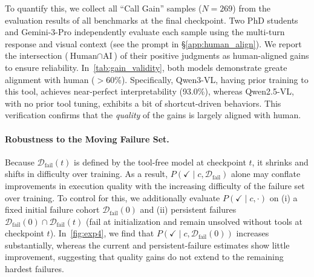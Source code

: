 To quantify this, we collect all ``Call Gain'' samples ($N=269$) from the evaluation results of all benchmarks at the final checkpoint.
%
Two PhD students and Gemini-3-Pro independently evaluate each sample using the multi-turn response and visual context (see the prompt in \S\ref{app:human_align}).
%
We report the intersection ($\text{Human} \cap \text{AI}$) of their positive judgments as human-aligned gains to ensure reliability.
%
In~\cref{tab:gain_validity}, both models demonstrate greate alignment with human ($>60\%$).
%
Specifically, Qwen3-VL, having prior training to this tool, achieves near-perfect interpretability (93.0\%), whereas Qwen2.5-VL, with no prior tool tuning, exhibits a bit of shortcut-driven behaviors.
%
This verification confirms that the \textit{quality} of the gains is largely aligned with human.

\paragraph{Robustness to the Moving Failure Set.}
\label{sec:moving_failure}
Because $\mathcal D_{\mathrm{fail}}(t)$ is defined by the tool-free model at checkpoint $t$, it shrinks and shifts in difficulty over training.
As a result, $P(\checkmark\mid c,\mathcal D_{\mathrm{fail}})$ alone may conflate improvements in execution quality with the increasing difficulty of the failure set over training.
To control for this, we additionally evaluate $P(\checkmark\mid c,\cdot)$ on
(i) a fixed initial failure cohort $\mathcal D_{\mathrm{fail}}(0)$ and
(ii) persistent failures $\mathcal D_{\mathrm{fail}}(0)\cap \mathcal D_{\mathrm{fail}}(t)$ (fail at initialization and remain unsolved without tools at checkpoint $t$).
In~\cref{fig:exp4}, we find that $P(\checkmark\mid c,\mathcal D_{\mathrm{fail}}(0))$ increases substantially,
whereas the current and persistent-failure estimates show little improvement,
suggesting that quality gains do not extend to the remaining hardest failures. 


